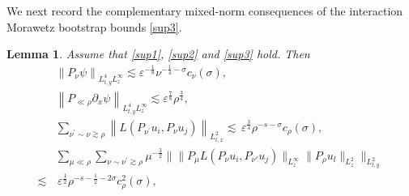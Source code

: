 \documentclass[11pt,letterpaper,reqno]{amsart}
\numberwithin{equation}{section}
\newtheorem{lemma}[theorem]{Lemma}
\theoremstyle{definition}
\theoremstyle{remark}
\begin{document}
We next record the complementary mixed-norm consequences of the interaction Morawetz bootstrap bounds \eqref{sup3}.
 \begin{lemma} Assume that  \eqref{sup1}, \eqref{sup2} and \eqref{sup3} hold. Then
     \begin{align}
      & \left\|    P_{\nu }   \psi \right\|_{L^4_{t,y}L^\infty_z}    
       \lesssim \varepsilon^{-\frac18}  \nu^{-\frac 14-\sigma} c_\nu (\sigma), \label{pre.IntM.infty} \\
        &   \left\|    P_{\ll \rho } \partial_x \psi \right\|_{L^4_{t,y}L^\infty_z}    
       \lesssim \varepsilon^{\frac78}   \rho^{ \frac 34}, \label{pre.IntM2}\\
           & \sum_{\nu^\prime \sim \nu \gtrsim \rho}   \left\|	L(P_{ \nu^{ \prime}} u_i, P_{\nu}u_j)\right\|_{L^2_{t,x}}  \lesssim \,  \varepsilon^{\frac34}     \rho^{-s-\sigma} c_{\rho} (\sigma), \label{pre.IntM1}\\
       & \sum_{  \mu \ll \rho} \sum_{  \nu\sim \nu^\prime \gtrsim \rho }  \mu^{-\frac 32} \Big\| \|    	 P_{  \mu } L(P_\nu u_i, 
 P_{\nu'} u_j) \|_{L^\infty_z} \|   P_{ \rho} u_l \|_{L^2_z}     \Big\|_{L^2_{t,y}}  \label{pre.IntM.quad}
 \\ \lesssim &\, \varepsilon^{\frac 12} \rho^{-s-\frac 12-2\sigma} c_\rho^2(\sigma), 
\nonumber
     \end{align} 
 \end{lemma}
\end{document}
